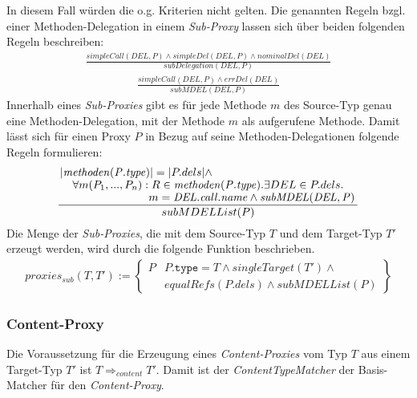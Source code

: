 \documentclass[a4paper,12pt]{article}
\begin{document}
In diesem Fall würden die o.g. Kriterien nicht gelten. Die genannten Regeln bzgl. einer Methoden-Delegation in einem \emph{Sub-Proxy} lassen sich über beiden folgenden Regeln beschreiben:
\begin{gather*}
\frac{\mathit{simpleCall(DEL,P)} \wedge \mathit{simpleDel(DEL,P) \wedge \mathit{nominalDel(DEL)}}}
{subDelegation(DEL,P)}
\end{gather*}
\begin{gather*}
\frac{\mathit{simpleCall(DEL,P)}\wedge\mathit{errDel(DEL)}
}
{subMDEL(DEL,P)}
\end{gather*}
Innerhalb eines \emph{Sub-Proxies} gibt es für jede Methode $m$ des Source-Typ genau eine Methoden-Delegation, mit der Methode $m$ als aufgerufene Methode. Damit lässt sich für einen Proxy $P$ in Bezug auf seine Methoden-Delegationen folgende Regeln formulieren:
\begin{gather*}
\frac{\splitfrac{|\mathit{methoden(P.type)}| = |P.dels| \wedge}{ \splitfrac{\forall m(P_1,...,P_n):R \in \mathit{methoden(P.type)}.\exists DEL \in P.dels.}{m = \mathit{DEL.call.name} \wedge \mathit{subMDEL(DEL,P)}
 }}
}
{subMDELList(P)}
\end{gather*}
Die Menge der \emph{Sub-Proxies}, die mit dem Source-Typ $T$ und dem Target-Typ $T'$ erzeugt werden, wird durch die folgende Funktion beschrieben.
\begin{gather*}
\mathit{proxies_{sub}(T,T')} := 
\left\{\begin{array}{l|l}
	P	& P\texttt{.type} = T \wedge  \mathit{singleTarget(T')} \wedge \mathit{ }\\
		& \mathit{equalRefs(P.dels)} \wedge \mathit{subMDELList(P)}
		 \end{array}
\right\}
\end{gather*}


\subsubsection{Content-Proxy}
Die Voraussetzung für die Erzeugung eines \emph{Content-Proxies} vom Typ $T$ aus einem Target-Typ $T'$ ist $T \Rightarrow_{content} T'$. Damit ist der \emph{ContentTypeMatcher} der Basis-Matcher für den \emph{Content-Proxy}.
\end{document}
